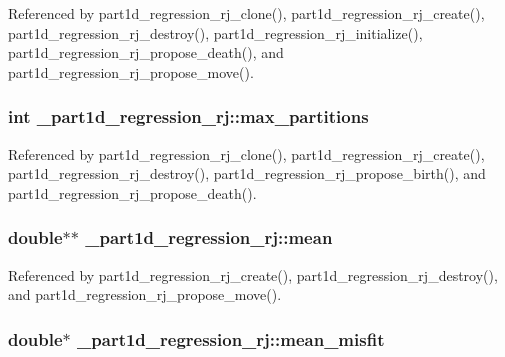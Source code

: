 Referenced by part1d\+\_\+regression\+\_\+rj\+\_\+clone(), part1d\+\_\+regression\+\_\+rj\+\_\+create(), part1d\+\_\+regression\+\_\+rj\+\_\+destroy(), part1d\+\_\+regression\+\_\+rj\+\_\+initialize(), part1d\+\_\+regression\+\_\+rj\+\_\+propose\+\_\+death(), and part1d\+\_\+regression\+\_\+rj\+\_\+propose\+\_\+move().

\subsubsection[{\texorpdfstring{max\+\_\+partitions}{max_partitions}}]{\setlength{\rightskip}{0pt plus 5cm}int \+\_\+part1d\+\_\+regression\+\_\+rj\+::max\+\_\+partitions}\hypertarget{struct__part1d__regression__rj_ab97c92ee8bb7df0bf96a1357bf2ec738}{}\label{struct__part1d__regression__rj_ab97c92ee8bb7df0bf96a1357bf2ec738}


Referenced by part1d\+\_\+regression\+\_\+rj\+\_\+clone(), part1d\+\_\+regression\+\_\+rj\+\_\+create(), part1d\+\_\+regression\+\_\+rj\+\_\+destroy(), part1d\+\_\+regression\+\_\+rj\+\_\+propose\+\_\+birth(), and part1d\+\_\+regression\+\_\+rj\+\_\+propose\+\_\+death().

\subsubsection[{\texorpdfstring{mean}{mean}}]{\setlength{\rightskip}{0pt plus 5cm}double$\ast$$\ast$ \+\_\+part1d\+\_\+regression\+\_\+rj\+::mean}\hypertarget{struct__part1d__regression__rj_ac7cbfad00ca6261ec35e0605f27e57b0}{}\label{struct__part1d__regression__rj_ac7cbfad00ca6261ec35e0605f27e57b0}


Referenced by part1d\+\_\+regression\+\_\+rj\+\_\+create(), part1d\+\_\+regression\+\_\+rj\+\_\+destroy(), and part1d\+\_\+regression\+\_\+rj\+\_\+propose\+\_\+move().

\subsubsection[{\texorpdfstring{mean\+\_\+misfit}{mean_misfit}}]{\setlength{\rightskip}{0pt plus 5cm}double$\ast$ \+\_\+part1d\+\_\+regression\+\_\+rj\+::mean\+\_\+misfit}\hypertarget{struct__part1d__regression__rj_a3511cbc88f0c8217f1c82df7d9727f0e}{}\label{struct__part1d__regression__rj_a3511cbc88f0c8217f1c82df7d9727f0e}


